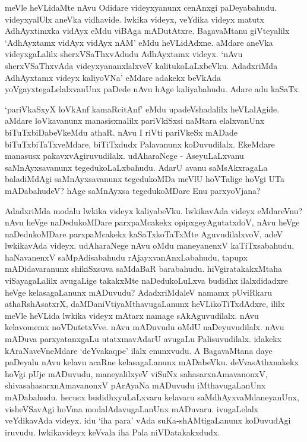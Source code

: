 meVle heVLidaMte nAvu Odidare videyxyanunx cenAnxgi paDeyabahudu. videyxyalUlx aneVka vidhavide. lwkika videyx, veYdika videyx matutx 
AdhAyxtimxka vidAyx eMdu viBAga mADutAtxre. BagavaMtanu giVteyalilx `AdhAyxtamx vidAyx vidAyx nAM' eMdu heVLidAdxne. aMdare aneVka 
videyxgaLalilx sherxVSaThxvAdudu AdhAyxtamx videyx. `nAvu sherxVSaThxvAda videyxyananxlalxveV kalitukoLaLxbeVku. AdadxriMda AdhAyxtamx videyx kaliyoVNa' 
eMdare adakekx beVkAda yoVgayxtegaLelalxvanUnx paDede nAvu hAge kaliyabahudu. Adare adu kaSaTx.

`pariVkaSxyX loVkAnf kamaRcitAnf' eMdu upadeVshadalilx heVLalAgide. aMdare loVkavanunx manasisxnalilx pariVkiSxsi naMtara elalxvanUnx biTuTxbiDabeVkeMdu athaR. 
nAvu I riVti pariVkeSx mADade biTuTxbiTaTxveMdare, biTiTxdudx Palavanunx koDuvudilalx. EkeMdare manasusx pakavxvAgiruvudilalx. udAharaNege - AseyuLaLxvanu 
saMnAyxsavanunx tegedukoLaLxbahudu. AdarU avanu saMsAkxragaLa baladiMdAgi saMnAyxsavanunx tegedukoMDa 
meVlU hoVTalige hoVgi UTa mADabahudeV? hAge saMnAyxsa tegedukoMDare Enu parxyoVjana?

AdadxriMda modalu lwkika videyx kaliyabeVku. lwkikavAda videyx eMdareVnu? nAvu heVge naDedukoMDare parxpaMcakekx opipxgeyAgutatxdoV, nAvu 
heVge naDedukoMDare parxpaMcakekx kaSaTxkoTaTxMte AguvudilalxvoV, adeV lwkikavAda videyx. udAharaNege nAvu oMdu maneyanenxV kaTiTxsabahudu, 
haNavanenxV saMpAdisabahudu rAjayxvanAnxLabahudu, tapupx mADidavaranunx shikiSxsuva saMdaBaR barabahudu. hiVgiratakakxMtaha viSayagaLalilx 
avugaLige takakxMte naDedukoLuLxva budidhx ilalxdidadxre heVge kelasagaLanunx mADuvudu? AdadxriMdaleV namamx pUviRkaru athaRshAsatxrX, 
daMDaniVtiyaMthavugaLanunx heVLikoTiTxdAdxre, ililx meVle heVLida lwkika videyx mAtarx namage sAkAguvudilalx. nAvu kelavomemx 
noVDutetxVve. nAvu mADuvudu oMdU naDeyuvudilalx. nAvu mADuva parxyatanxgaLu utatxmavAdarU avugaLu Palisuvudilalx. idakekx 
kAraNaveVneMdare `deYvakaqpe' ilalx enunxvudu. A BagavaMtana daye paDeyalu nAvu kelavu acaRne kelasagaLanunx mADabeVku. deVvasAthxnakekx 
hoVgi pUje mADuvudu, maneyalilxyeV viSuNx sahasarxnAmavanonxV, shivasahasarxnAmavanonxV pArAyaNa mADuvudu iMthavugaLanUnx 
mADabahudu. hecucx budidhxyuLaLxvaru kelavaru saMdhAyxvaMdaneyanUnx, visheVSavAgi hoVma modalAdavugaLanUnx mADuvaru. 
ivugaLelalx veYdikavAda videyx. idu `iha para' vAda suKa-shAMtigaLanunx koDuvudAgi iruvudu. lwkikavideyx keVvala iha Pala niVDatakakxdudx.

